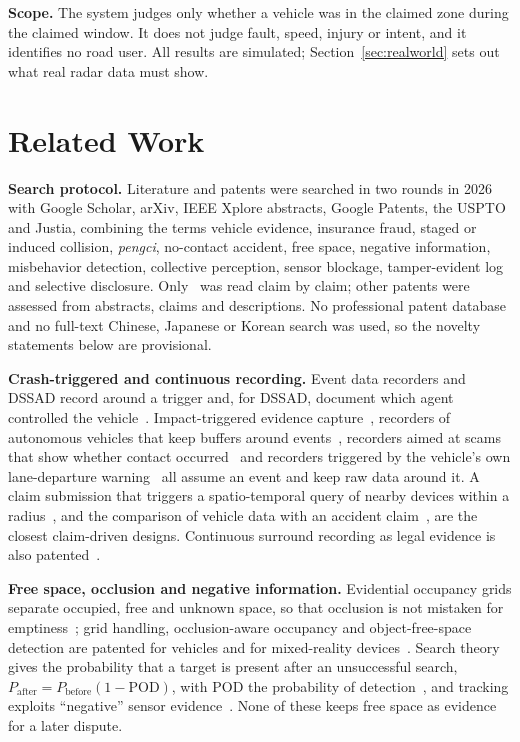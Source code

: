 \textbf{Scope.} The system judges only whether a vehicle was in the claimed zone during the claimed window. It does not judge fault, speed, injury or intent, and it identifies no road user. All results are simulated; Section~\ref{sec:realworld} sets out what real radar data must show.

\section{Related Work}\label{sec:related}

\textbf{Search protocol.} Literature and patents were searched in two rounds in 2026 with Google Scholar, arXiv, IEEE Xplore abstracts, Google Patents, the USPTO and Justia, combining the terms vehicle evidence, insurance fraud, staged or induced collision, \emph{pengci}, no-contact accident, free space, negative information, misbehavior detection, collective perception, sensor blockage, tamper-evident log and selective disclosure. Only~\cite{b24} was read claim by claim; other patents were assessed from abstracts, claims and descriptions. No professional patent database and no full-text Chinese, Japanese or Korean search was used, so the novelty statements below are provisional.

\textbf{Crash-triggered and continuous recording.} Event data recorders and DSSAD record around a trigger and, for DSSAD, document which agent controlled the vehicle~\cite{b7,b8}. Impact-triggered evidence capture~\cite{b10}, recorders of autonomous vehicles that keep buffers around events~\cite{b12}, recorders aimed at scams that show whether contact occurred~\cite{b14} and recorders triggered by the vehicle's own lane-departure warning~\cite{b17,b18} all assume an event and keep raw data around it. A claim submission that triggers a spatio-temporal query of nearby devices within a radius~\cite{b15}, and the comparison of vehicle data with an accident claim~\cite{b16}, are the closest claim-driven designs. Continuous surround recording as legal evidence is also patented~\cite{b9}.

\textbf{Free space, occlusion and negative information.} Evidential occupancy grids separate occupied, free and unknown space, so that occlusion is not mistaken for emptiness~\cite{b19}; grid handling, occlusion-aware occupancy and object-free-space detection are patented for vehicles and for mixed-reality devices~\cite{b20,b22,b23}. Search theory gives the probability that a target is present after an unsuccessful search, $P_{\mathrm{after}} = P_{\mathrm{before}}(1-\mathrm{POD})$, with POD the probability of detection~\cite{b30,b31}, and tracking exploits ``negative'' sensor evidence~\cite{b32}. None of these keeps free space as evidence for a later dispute.


